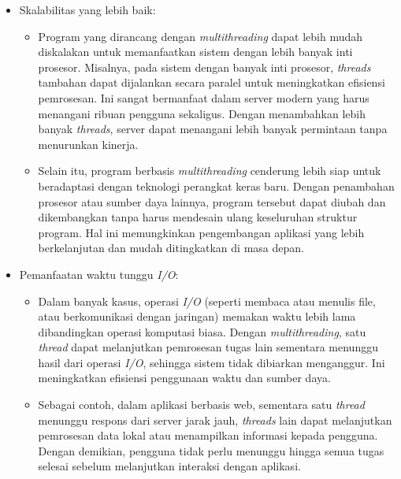 \documentclass[12pt]{article}
\begin{document}
\begin{itemize}
    \item Skalabilitas yang lebih baik:
    \begin{itemize}
        \item Program yang dirancang dengan \textit{multithreading} dapat lebih mudah diskalakan untuk memanfaatkan sistem dengan lebih banyak inti prosesor. Misalnya, pada sistem dengan banyak inti prosesor, \textit{threads} tambahan dapat dijalankan secara paralel untuk meningkatkan efisiensi pemrosesan. Ini sangat bermanfaat dalam server modern yang harus menangani ribuan pengguna sekaligus. Dengan menambahkan lebih banyak \textit{threads}, server dapat menangani lebih banyak permintaan tanpa menurunkan kinerja.
        \item Selain itu, program berbasis \textit{multithreading} cenderung lebih siap untuk beradaptasi dengan teknologi perangkat keras baru. Dengan penambahan prosesor atau sumber daya lainnya, program tersebut dapat diubah dan dikembangkan tanpa harus mendesain ulang keseluruhan struktur program. Hal ini memungkinkan pengembangan aplikasi yang lebih berkelanjutan dan mudah ditingkatkan di masa depan.
    \end{itemize}
    
    \item Pemanfaatan waktu tunggu \textit{I/O}:
    \begin{itemize}
        \item Dalam banyak kasus, operasi \textit{I/O} (seperti membaca atau menulis file, atau berkomunikasi dengan jaringan) memakan waktu lebih lama dibandingkan operasi komputasi biasa. Dengan \textit{multithreading}, satu \textit{thread} dapat melanjutkan pemrosesan tugas lain sementara menunggu hasil dari operasi \textit{I/O}, sehingga sistem tidak dibiarkan menganggur. Ini meningkatkan efisiensi penggunaan waktu dan sumber daya.
        \item Sebagai contoh, dalam aplikasi berbasis web, sementara satu \textit{thread} menunggu respons dari server jarak jauh, \textit{threads} lain dapat melanjutkan pemrosesan data lokal atau menampilkan informasi kepada pengguna. Dengan demikian, pengguna tidak perlu menunggu hingga semua tugas selesai sebelum melanjutkan interaksi dengan aplikasi.
    \end{itemize}
    

\end{itemize}
\end{document}
